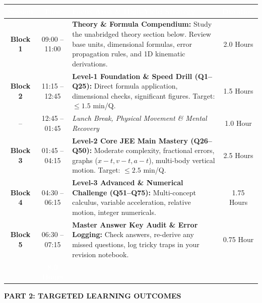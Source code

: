 \documentclass[11pt,a4paper]{article}
\begin{document}
\begin{center}
\renewcommand{\arraystretch}{1.25}
\small
\begin{tabularx}{\textwidth}{|c|c|X|c|}
\hline
\rowcolor{tableDarkHeader}
\textcolor{white}{\textbf{Session}} & \textcolor{white}{\textbf{Time}} & \textcolor{white}{\textbf{Focus Area \& High-Yield Strategy}} & \textcolor{white}{\textbf{Duration}} \\
\hline
\rowcolor{white}
\textbf{Block 1} & 09:00 -- 11:00 & \textbf{Theory \& Formula Compendium:} Study the unabridged theory section below. Review base units, dimensional formulas, error propagation rules, and 1D kinematic derivations. & 2.0 Hours \\
\hline
\rowcolor{tableStripe}
\textbf{Block 2} & 11:15 -- 12:45 & \textbf{Level-1 Foundation \& Speed Drill (Q1--Q25):} Direct formula application, dimensional checks, significant figures. Target: $\le 1.5$ min/Q. & 1.5 Hours \\
\hline
\rowcolor{white}
-- & 12:45 -- 01:45 & \textit{Lunch Break, Physical Movement \& Mental Recovery} & 1.0 Hour \\
\hline
\rowcolor{tableStripe}
\textbf{Block 3} & 01:45 -- 04:15 & \textbf{Level-2 Core JEE Main Mastery (Q26--Q50):} Moderate complexity, fractional errors, graphs ($x-t, v-t, a-t$), multi-body vertical motion. Target: $\le 2.5$ min/Q. & 2.5 Hours \\
\hline
\rowcolor{white}
\textbf{Block 4} & 04:30 -- 06:15 & \textbf{Level-3 Advanced \& Numerical Challenge (Q51--Q75):} Multi-concept calculus, variable acceleration, relative motion, integer numericals. & 1.75 Hours \\
\hline
\rowcolor{tableStripe}
\textbf{Block 5} & 06:30 -- 07:15 & \textbf{Master Answer Key Audit \& Error Logging:} Check answers, re-derive any missed questions, log tricky traps in your revision notebook. & 0.75 Hour \\
\hline
\rowcolor{tableDarkHeader}
\multicolumn{3}{|r|}{\textcolor{white}{\textbf{TOTAL DEDICATED STUDY TIME}}} & \textcolor{white}{\textbf{8.0 Hours}} \\
\hline
\end{tabularx}
\end{center}

\vspace{5pt}

\begin{tcolorbox}[sectionbanner]
  {\large \textbf{\textsf{PART 2: TARGETED LEARNING OUTCOMES}}}
\end{tcolorbox}
\vspace{3pt}
\end{document}
